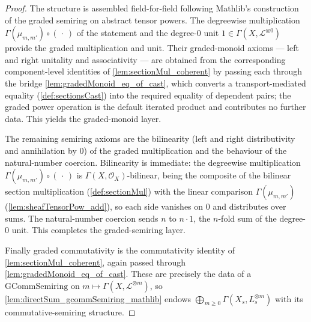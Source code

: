 \begin{proof}
  The structure is assembled field-for-field following Mathlib's construction of
  the graded semiring on abstract tensor powers. The
  degreewise multiplication \(\Gamma(\mu_{m,m'}) \circ (\,\cdot\,)\) of the
  statement and the degree-\(0\) unit \(1 \in \Gamma(X, \mathcal{L}^{\otimes 0})\)
  provide the graded multiplication and unit. Their graded-monoid axioms --- left
  and right unitality and associativity --- are obtained from the corresponding
  component-level identities of \cref{lem:sectionMul_coherent} by passing each
  through the bridge \cref{lem:gradedMonoid_eq_of_cast}, which converts a
  transport-mediated equality (\cref{def:sectionsCast}) into the required equality
  of dependent pairs; the graded power operation is the default iterated product
  and contributes no further data. This yields the graded-monoid layer.

  The remaining semiring axioms are the bilinearity (left and right distributivity
  and annihilation by \(0\)) of the graded multiplication and the behaviour of the
  natural-number coercion. Bilinearity is immediate: the degreewise multiplication
  \(\Gamma(\mu_{m,m'}) \circ (\,\cdot\,)\) is \(\Gamma(X,\mathcal{O}_X)\)-bilinear,
  being the composite of the bilinear section multiplication (\cref{def:sectionMul})
  with the linear comparison \(\Gamma(\mu_{m,m'})\)
  (\cref{lem:sheafTensorPow_add}), so each side vanishes on \(0\) and distributes
  over sums. The natural-number coercion sends \(n\) to \(n \cdot 1\), the
  \(n\)-fold sum of the degree-\(0\) unit. This completes the graded-semiring
  layer.

  Finally graded commutativity is the commutativity identity of
  \cref{lem:sectionMul_coherent}, again passed through
  \cref{lem:gradedMonoid_eq_of_cast}. These are precisely the data of a
  \(\mathrm{GCommSemiring}\) on \(m \mapsto \Gamma(X, \mathcal{L}^{\otimes m})\),
  so \cref{lem:directSum_gcommSemiring_mathlib} endows
  \(\bigoplus_{m \ge 0} \Gamma(X_s, L_s^{\otimes m})\) with its commutative-semiring
  structure.
\end{proof}

